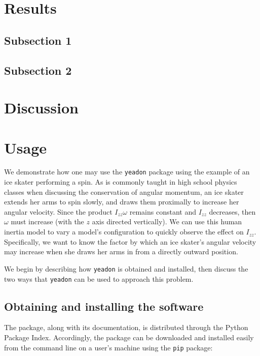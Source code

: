 \documentclass[10pt]{article}
\begin{document}
\section*{Results}

\subsection*{Subsection 1}

\subsection*{Subsection 2}

\section*{Discussion}


\section*{Usage}

We demonstrate how one may use the \verb+yeadon+ package using the example of
an ice skater performing a spin. As is commonly taught in high school physics
classes when discussing the conservation of angular momentum, an ice skater
extends her arms to spin slowly, and draws them proximally to increase her
angular velocity. Since the product $I_{zz}\omega$ remains constant and $I_{zz}$
decreases, then $\omega$ must increase (with the $z$ axis directed vertically).
We can use this human inertia model to vary a model's configuration to quickly
observe the effect on $I_{zz}$. Specifically, we want to know the factor by
which an ice skater's angular velocity may increase when she draws her arms in
from a directly outward position.

We begin by describing how \verb+yeadon+ is obtained and installed, then
discuss the two ways that \verb+yeadon+ can be used to approach this problem.

\subsection*{Obtaining and installing the software}

The package, along with its documentation, is distributed through the Python
Package Index. Accordingly, the package can be downloaded and installed easily
from the command line on a user's machine using the \verb+pip+ package:
\end{document}
